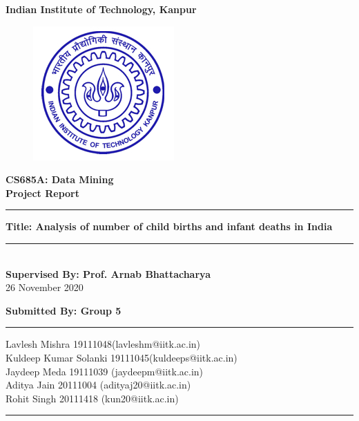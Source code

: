 \documentclass[12pt]{article}
\begin{document}
\begin{titlepage}
\begin{center}

    \textbf{\LARGE \vspace*{15pt}Indian Institute of Technology, Kanpur}
\end{center}
\begin{figure}[h]
\centering
\includegraphics[scale=0.7]{images/bluelog.jpg}
\end{figure}
    \begin{center}
    \textbf{\Large CS685A: Data Mining\\
        Project Report \\}
\end{center}


\begin{center}
\vspace{1 cm}
\rule{\textwidth}{2pt}\linebreak
\Large
\textbf{Title: Analysis of number of child births and infant deaths in India}
\rule{\textwidth}{2pt}\\
\vspace{2.5 cm}
\Large
\textbf{Supervised By: Prof. Arnab Bhattacharya}\\
\vspace{2.5cm}
\normalsize{26 November 2020}

\end{center}
\end{titlepage}
\newpage

\restoregeometry
\begin{titlepage}
    \begin{center}
        \begin{center}
        \textbf{\Large Submitted By: Group 5}\\
        \end{center}

        \medskip

        \vspace{1cm}
        \rule{\textwidth}{2pt}
        \large{Lavlesh Mishra \hfill 19111048(lavleshm@iitk.ac.in)}\\
        \large{Kuldeep Kumar Solanki \hfill 19111045(kuldeeps@iitk.ac.in)}\\
        \large{Jaydeep Meda \hfill 19111039 (jaydeepm@iitk.ac.in)}\\
        \large{Aditya Jain \hfill 20111004 (adityaj20@iitk.ac.in)}\\
        \large{Rohit Singh \hfill 20111418 (kun20@iitk.ac.in)}\\
        \medskip
        \rule{\textwidth}{2pt}
    \end{center}
\end{titlepage}
\newpage
\tableofcontents
\newpage
\end{document}
